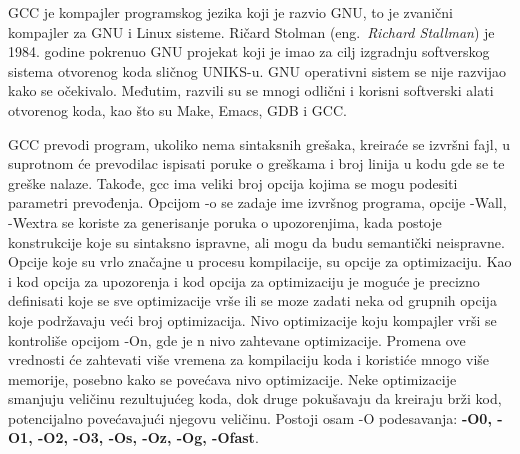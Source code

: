 \documentclass[a4paper]{article}
\begin{document}
GCC je kompajler programskog jezika koji je razvio GNU, to je zvanični kompajler za GNU i Linux sisteme. Ričard Stolman (eng.~{\em Richard Stallman}) je 1984. godine pokrenuo GNU projekat koji je imao za cilj izgradnju softverskog sistema otvorenog koda sličnog UNIKS-u. GNU operativni sistem se nije razvijao kako se očekivalo. Međutim, razvili su se mnogi odlični i korisni softverski alati otvorenog koda, kao što su Make, Emacs, GDB i GCC. \cite{gccVsClang}

GCC prevodi program, ukoliko nema sintaksnih grešaka, kreiraće se izvršni fajl, u suprotnom će prevodilac ispisati poruke o greškama i broj linija u kodu gde se te greške nalaze. Takođe, gcc ima veliki broj opcija kojima se mogu podesiti parametri prevođenja. Opcijom -o se zadaje ime izvršnog programa, opcije -Wall, -Wextra se koriste za generisanje poruka o upozorenjima, kada postoje konstrukcije koje su sintaksno ispravne, ali mogu da budu semantički neispravne. Opcije koje su vrlo značajne u procesu kompilacije, su opcije za optimizaciju. Kao i kod opcija za upozorenja i kod opcija za optimizaciju je moguće je precizno definisati koje se sve optimizacije vrše ili se moze zadati neka od grupnih opcija koje podržavaju veći broj optimizacija. Nivo optimizacije koju kompajler vrši se kontroliše opcijom -On, gde je n nivo zahtevane optimizacije. Promena ove vrednosti će zahtevati više vremena za kompilaciju koda i koristiće mnogo više memorije, posebno kako se povećava nivo optimizacije. \cite{gnuSamardzic} Neke optimizacije smanjuju veličinu rezultujućeg koda, dok druge pokušavaju da kreiraju brži kod, potencijalno povećavajući njegovu veličinu. Postoji osam -O podesavanja: \textbf{-O0, -O1, -O2, -O3, -Os, -Oz, -Og, -Ofast}.
\end{document}
